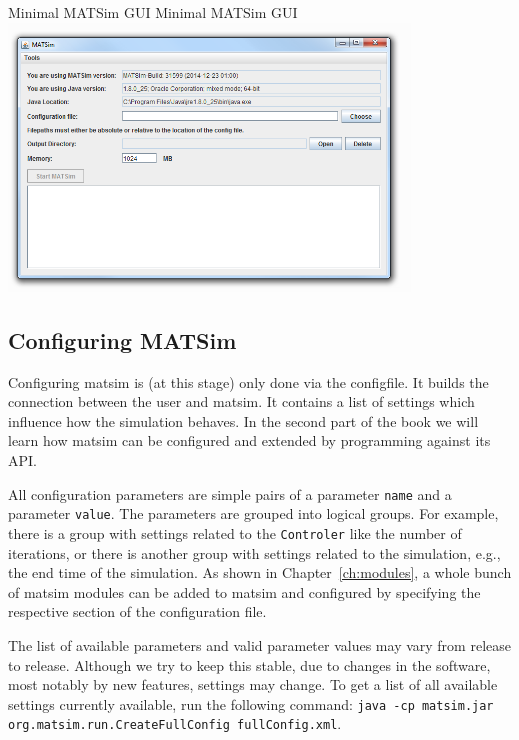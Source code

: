 \createfigure%
{Minimal MATSim GUI}%
{Minimal MATSim GUI}%
{\label{fig:matsimgui}}%
{\includegraphics[width=0.8\textwidth, angle=0]{using/figures/matsimgui.png}}%
{}

\subsection{Configuring MATSim}
\label{sec:config}
Configuring \gls{matsim} is (at this stage) only done via the \gls{configfile}. It builds the connection between the user and \gls{matsim}. It contains a list of settings which influence how the simulation behaves. In the second part of the book we will learn how \gls{matsim} can be configured and extended by programming against its API.

All configuration parameters are simple pairs of a \gls{parameter} \lstinline|name| and a \gls{parameter} \lstinline|value|. The \glspl{parameter} are grouped into logical groups. For example, there is a group with settings related to the \lstinline|Controler| like the number of \glspl{iteration}, or there is another group with settings related to the \gls{simulation}, e.g.,\,the end time of the simulation. As shown in Chapter~\ref{ch:modules}, a whole bunch of \gls{matsim} modules can be added to \gls{matsim} and configured by specifying the respective section of the configuration file.

The list of available parameters and valid parameter values may vary from release to release. Although we try to keep this stable, due to changes in the software, most notably by new features, settings may change. To get a list of all available settings currently available, run the following command: \lstinline|java -cp matsim.jar org.matsim.run.CreateFullConfig fullConfig.xml|.

